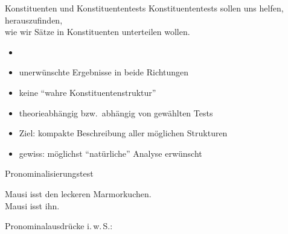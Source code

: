 \begin{frame}
  {Konstituenten und Konstituententests}
  \pause
  {\Large \alert{Konstituententests sollen uns helfen, herauszufinden,\\
  wie wir Sätze in Konstituenten unterteilen wollen.}}\\
  \Zeile
  \pause
  \pause
  \Halbzeile
  \begin{itemize}[<+->]
    \item {}
    \item unerwünschte Ergebnisse in beide Richtungen
    \item keine "`wahre Konstituentenstruktur"'
    \item theorieabhängig bzw.\ abhängig von gewählten Tests
    \Zeile
    \item Ziel: kompakte Beschreibung aller möglichen Strukturen
    \item gewiss: möglichst "`natürliche"' Analyse erwünscht
  \end{itemize}
\end{frame}

\begin{frame}
  {Pronominalisierungstest}
  \pause
  \begin{exe}
    \ex Mausi isst \alert<3->{den leckeren Marmorkuchen}.\\
    \pause
       Mausi isst \alert{ihn}.
    \pause
    \pause
  \end{exe}
  \pause
  \Halbzeile
  Pronominalausdrücke i.\,w.\,S.:
  \begin{exe}
      \pause
      \pause
  \end{exe}
\end{frame}

